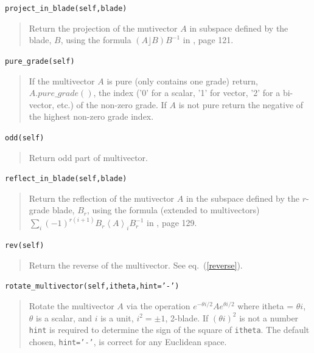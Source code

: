 \documentclass[12pt]{report}
\newcommand{\lp}{\left (}
\newcommand{\rp}{\right )}
\newcommand{\grade}[1]{\left < {#1} \right >}
\newcommand{\paren}[1]{\lp {#1} \rp}
\newcommand{\T}[1]{\texttt{#1}}
\begin{document}

\T{project\_in\_blade(self,blade)}
\begin{quote}
    Return the projection of the mutivector $A$ in subspace defined by the blade, $B$, using the formula
    $\paren{A\rfloor B}B^{-1} $ in \cite{Macdonald 1}, page 121.
\end{quote}

\T{pure\_grade(self)}
\begin{quote}
	If the multivector $A$ is pure (only contains one grade) return, $A.pure\_grade()$, the index ('0' for a scalar,
    '1' for vector,	'2' for a bi-vector, etc.) of the non-zero grade.  If $A$ is not pure return the negative of the
    highest non-zero grade index.   
\end{quote}

\T{odd(self)}
\begin{quote}
	Return odd part of multivector.
\end{quote}

\T{reflect\_in\_blade(self,blade)}
\begin{quote}
    Return the reflection of the mutivector $A$ in the subspace defined by the $r$-grade blade, $B_{r}$, using the formula
    (extended to multivectors) $\sum_{i} \paren{-1}^{r\paren{i+1}}{B}_{r}\grade{A}_{i}B_{r}^{-1}$ in
    \cite{Macdonald 1}, page 129.
\end{quote}

\T{rev(self)}
\begin{quote}
   Return the reverse of the multivector.  See eq.~(\ref{reverse}).
\end{quote}

\T{rotate\_multivector(self,itheta,hint='-')}
\begin{quote}
    Rotate the multivector $A$ via the operation $e^{-\theta i/2}Ae^{\theta i/2}$
    where itheta = $\theta i$, $\theta$ is a scalar, and $i$ is a unit, $i^{2} = \pm 1$, 2-blade.
    If $\paren{\theta i}^{2}$ is not a number \T{hint} is required to determine the sign of the
    square of \T{itheta}.  The default chosen, \T{hint='-'}, is correct for any Euclidean space.
\end{quote}
\end{document}
